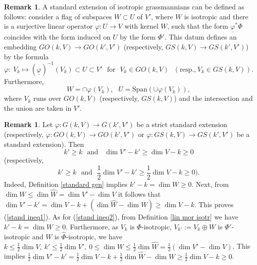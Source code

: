 \documentclass[12pt]{amsart}
\newcommand\Span{\text{Span}}
\renewcommand{\phi}{\varphi}
\theoremstyle{definition}
\newtheorem{remark}[theorem]{Remark}
\begin{document}
\begin{remark}\label{intrinsic def2}
A standard extension of isotropic grassmannians can be defined as follows: consider a flag of subspaces
$W\subset U$ of $V'$, where $W$ is isotropic and there is a surjective linear operator $\underline{\phi}:U\to V$ with
kernel $W$, such that the form $\underline{\phi}^*\Phi$ coincides with the form induced on $U$ by the form $\Phi'$.
This datum defines an embedding $GO(k,V)\to GO(k',V')$ (respectively, $GS(k,V)\to GS(k',V')$) by the formula
$$
\phi:\ V_k\mapsto(\underline{\phi})^{-1}(V_k)\subset U\subset V'\ \ \ \textrm{for} \ \ \ V_k\in GO(k,V) \ \ \
(\textrm{resp.,}\ V_k\in GS(k,V)).
$$
Furthermore,
\begin{equation}\label{gen W,U}
W=\cap \phi(V_k),\ \ \ U=\Span(\cup \phi(V_k)),
\end{equation}
where $V_k$ runs over $GO(k,V)$ (respectively, $GS(k,V)$) and the intersection and the union are taken in $V'$.
\end{remark}


\begin{remark}\label{prop of st ext1}
Let $\phi:G(k,V)\to G(k',V')$ be a strict standard extension (respectively, $\phi:GO(k,V)\to GO(k',V')$ or
$\phi:GS(k,V)\to GS(k',V')$ be a standard extension). Then
\begin{equation}\label{stand ineq1}
k'\ge k\ \ \  \textrm{and}\ \ \ \ \dim V'-k'\ge\dim V-k\ge0
\end{equation}
(respectively,
\begin{equation}\label{stand ineq2}
k'\ge k\ \ \  \textrm{and}\ \ \ \frac{1}{2}\dim V'-k'\ge\frac{1}{2}\dim V-k\ge0).
\end{equation}
Indeed, Definition \ref{standard gen} implies $k'-k=\dim W\ge0$.
Next, from $\dim W\le\dim\hat{W}=\dim V'-\dim V$
it follows that $\dim V'-k'=\dim V-k+(\dim\hat{W}-\dim W)\ge\dim V-k$. This proves (\ref{stand ineq1}).
As for (\ref{stand ineq2}), from Definition
\ref{lin mor isotr} we have $k'-k=\dim W\ge0$. Furthermore, as $V_k$ is $\Phi$-isotropic,
$V_{k'}:=V_k\oplus W$ is $\Phi'$-isotropic and $W$ is $\hat{\Phi}$-isotropic, we have
$k\le\frac{1}{2}\dim V,\ k'\le\frac{1}{2}\dim V',\ 0\le\dim W\le\frac{1}{2}\dim\hat{W}=\frac{1}{2}(\dim V'-\dim V)$.
This implies $\frac{1}{2}\dim V'-k'=\frac{1}{2}\dim V-k+\frac{1}{2}\dim\hat{W}-\dim W\ge\frac{1}{2}\dim V-k\ge0$.
\end{remark}
\end{document}
